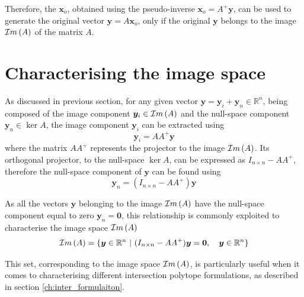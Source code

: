 Therefore, the $\bm{x}_o$, obtained using the pseudo-inverse $\bm{x}_o=A^+\bm{y}$, can be used to generate the original vector $\bm{y} = A\bm{x}_o$, only if the original $\bm{y}$ belongs to the image $\mathcal{I}m\left(A\right)$ of the matrix $A$. 

\section{Characterising the image space}
\label{ch:image_char}

As discussed in previous section, for any given vector $\bm{y} = \bm{y}_i + \bm{y}_n\in\mathbb{R}^n$, being composed of the image component $\bm{y}_i\in\mathcal{I}m\left(A\right)$ and the null-space component $\bm{y}_n\in\ker{A}$, the image component $\bm{y}_i$ can be extracted using 
\begin{equation}
    \bm{y}_i =  AA^+\bm{y}
\end{equation}
where the matrix $AA^+$ represents the projector to the image $\mathcal{I}m\left(A\right)$. Its orthogonal projector, to the null-space $\ker{A}$, can be expressed as $I_{n\times n} - AA^+$, therefore the null-space component of $\bm{y}$ can be found using
\begin{equation}
    \bm{y}_n = (I_{n\times n} - AA^+)\bm{y}
\end{equation}

As all the vectors $\bm{y}$ belonging to the image $\mathcal{I}m\left(A\right)$ have the null-space component equal to zero $\bm{y}_n=\bm{0}$, this relationship is commonly exploited to characterise the image space $\mathcal{I}m\left(A\right)$
\begin{equation}
   \mathcal{I}m\left(A\right) = \{ \bm{y}\in\mathbb{R}^n ~|~(I_{n\times n} - AA^+)\bm{y} = \bm{0}, \quad \bm{y}\in\mathbb{R}^n \}
   \label{eq:image_poly}
\end{equation}

This set, corresponding to the image space $\mathcal{I}m\left(A\right)$, is particularly useful when it comes to characterising different intersection polytope formulations, as described in section \ref{ch:inter_formulaiton}.